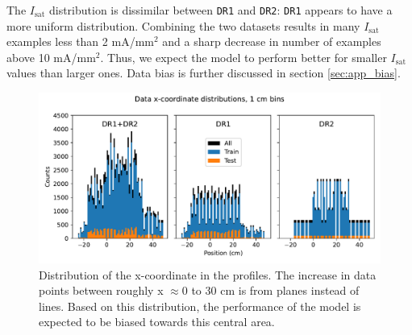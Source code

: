 The $I_\text{sat}$ distribution is dissimilar between \texttt{DR1} and \texttt{DR2}: \texttt{DR1} appears to have a more uniform distribution. Combining the two datasets results in many $I_\text{sat}$ examples less than 2 mA/mm$^2$ and a sharp decrease in number of examples above 10 mA/mm$^2$. Thus, we expect the model to perform better for smaller $I_\text{sat}$ values than larger ones. Data bias is further discussed in section \ref{sec:app_bias}.


\begin{figure}
	\centering
	\includegraphics[width=\linewidth]{figures/PP1_02_x_distribution.pdf}
	\caption[Distribution of probe x-coordinates in the dataset]{\label{fig:PP1_02_x_distribution}Distribution of the x-coordinate in the profiles. The increase in data points between roughly x $\approx 0$ to 30 cm is from planes instead of lines. Based on this distribution, the performance of the model is expected to be biased towards this central area.}
\end{figure}

